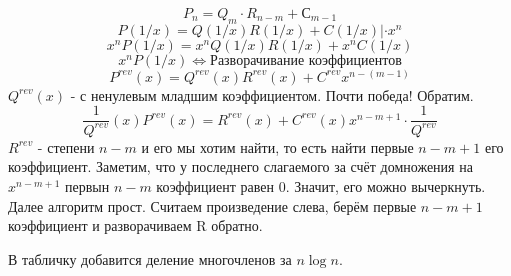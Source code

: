 \begin{itemize}
	    \[P_n = Q_m\cdot R_{n - m} + С_{m - 1}\]
	    \[P(1/x) = Q(1/x)R(1/x) + C(1/x) | \cdot x^n\]
	    \[x^nP(1/x) = x^nQ(1/x) R(1/x) + x^nC(1/x)\]
	    \[x^nP(1/x) \Leftrightarrow \text{Разворачивание коэффициентов}\]
	    \[P^{rev}(x) = Q^{rev}(x)R^{rev}(x) + C^{rev}x^{n - (m - 1)}\]
	    $Q^{rev}(x)$ - с ненулевым младшим коэффициентом. Почти победа! Обратим.
	    \[\frac{1}{Q^{rev}}(x)P^{rev}(x) = R^{rev}(x) + C^{rev}(x)x^{n - m + 1}\cdot\frac{1}{Q^{rev}}\]
	    $R^{rev}$ - степени $n - m$ и его мы хотим найти, то есть найти первые $n - m + 1$ его коэффициент. 
	    Заметим, что у последнего слагаемого за счёт домножения на $x^{n - m + 1}$ первын $n - m$ коэффициент равен 0. 
	    Значит, его можно вычеркнуть. Далее алгоритм прост. Считаем произведение слева, берём первые $n - m + 1$ коэффициент и разворачиваем R
	    обратно. 

	    В табличку добавится деление многочленов за $n\log n$. 
\end{itemize}